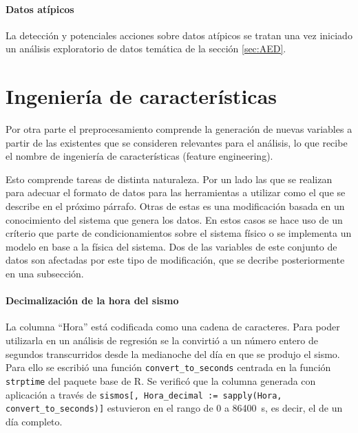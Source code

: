 \documentclass[a4paper]{report}
\begin{document}
\paragraph{Datos atípicos}
La detección y potenciales acciones sobre datos atípicos se tratan una vez iniciado un análisis exploratorio de datos temática de la sección \ref{sec:AED}.



\section{Ingeniería de características}

Por otra parte el preprocesamiento comprende la generación de nuevas variables a partir de las existentes que se consideren relevantes para el análisis, lo que recibe el nombre de ingeniería de características (feature engineering).

Esto comprende tareas de distinta naturaleza.
Por un lado las que se realizan para adecuar el formato de datos para las herramientas a utilizar como el que se describe en el próximo párrafo.
Otras de estas es una modificación basada en un conocimiento del sistema que genera los datos.
En estos casos se hace uso de un críterio que parte de condicionamientos sobre el sistema físico o se implementa un modelo en base a la física del sistema.
Dos de las variables de este conjunto de datos son afectadas por este tipo de modificación, que se decribe posteriormente en una subsección.



\paragraph{Decimalización de la hora del sismo}
La columna ``Hora'' está codificada como una cadena de caracteres.
Para poder utilizarla en un análisis de regresión se la convirtió a un número entero de segundos transcurridos desde la medianoche del día en que se produjo el sismo. 
Para ello se escribió una función \verb'convert_to_seconds' centrada en la función \verb'strptime' del paquete base de R.
Se verificó que la columna generada con aplicación a través de \verb'sismos[, Hora_decimal := sapply(Hora, convert_to_seconds)]' estuvieron en el rango de \num{0} a \SI{86400}{\second}, es decir, el de un día completo.
\end{document}
